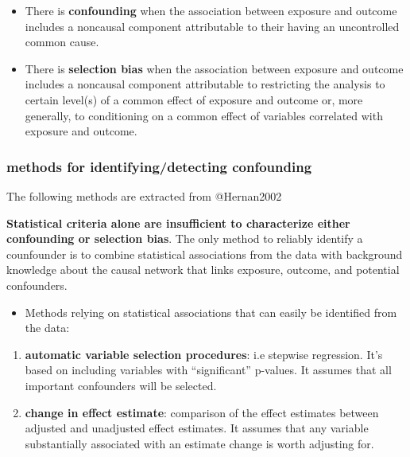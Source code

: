 \documentclass[
]{article}
\providecommand{\tightlist}{%
  \setlength{\itemsep}{0pt}\setlength{\parskip}{0pt}}
\begin{document}
\begin{itemize}
\item
  There is \textbf{confounding} when the association between exposure
  and outcome includes a noncausal component attributable to their
  having an uncontrolled common cause.
\item
  There is \textbf{selection bias} when the association between exposure
  and outcome includes a noncausal component attributable to restricting
  the analysis to certain level(s) of a common effect of exposure and
  outcome or, more generally, to conditioning on a common effect of
  variables correlated with exposure and outcome.
\end{itemize}

\hypertarget{methods-for-identifyingdetecting-confounding}{%
\subsubsection{methods for identifying/detecting
confounding}\label{methods-for-identifyingdetecting-confounding}}

The following methods are extracted from @Hernan2002

\textbf{Statistical criteria alone are insufficient to characterize
either confounding or selection bias}. The only method to reliably
identify a counfounder is to combine statistical associations from the
data with background knowledge about the causal network that links
exposure, outcome, and potential confounders.

\begin{itemize}
\tightlist
\item
  Methods relying on statistical associations that can easily be
  identified from the data:
\end{itemize}

\begin{enumerate}
\def\labelenumi{\arabic{enumi}.}
\item
  \textbf{automatic variable selection procedures}: i.e stepwise
  regression. It's based on including variables with ``significant''
  p-values. It assumes that all important confounders will be selected.
\item
  \textbf{change in effect estimate}: comparison of the effect estimates
  between adjusted and unadjusted effect estimates. It assumes that any
  variable substantially associated with an estimate change is worth
  adjusting for.
\end{enumerate}
\end{document}
